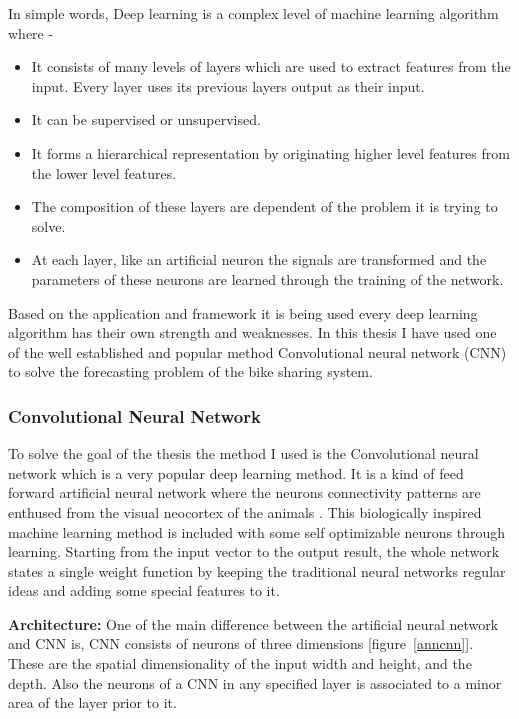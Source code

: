 In simple words, Deep learning is a complex level of machine learning algorithm where - 

\begin{itemize}
\item It consists of many levels of layers which are used to extract features from the input. Every layer uses its previous layers output as their input. 

\item It can be supervised or unsupervised.

\item It forms a hierarchical representation by originating higher level features from the lower level features. 

\item The composition of these layers are dependent of the problem it is trying to solve. 

\item At each layer, like an artificial neuron the signals are transformed and the parameters of these neurons are learned through the training of the network.

\end{itemize}


Based on the application and framework it is being used every deep learning algorithm has their own strength and weaknesses. In this thesis I have used one of the well established and popular method Convolutional neural network (CNN) to solve the forecasting problem of the bike sharing system. 

\subsubsection{Convolutional Neural Network}
\label{CNN}



To solve the goal of the thesis the method I used is the Convolutional neural network which is a very popular deep learning method. It is a kind of feed forward artificial neural network where the neurons connectivity patterns are enthused from the visual neocortex of the animals \cite{o2015introduction}. This biologically inspired machine learning method is included with some self optimizable neurons through learning. Starting from the input vector to the output result, the whole network states a single weight function by keeping the traditional neural networks regular ideas and adding some special features to it. 

\textbf{Architecture:}
One of the main difference between the artificial neural network and CNN is, CNN consists of neurons of three dimensions [figure~\ref{anncnn}]. These are the spatial dimensionality of the input width and height, and the depth. Also the neurons of a CNN in any specified layer is associated to a minor area of the layer prior to it. 

